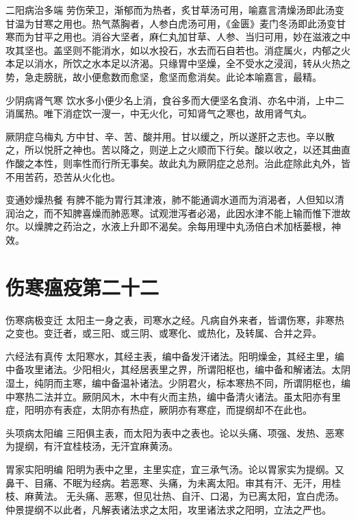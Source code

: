 \documentclass[a4paper,12pt,UTF8,twoside]{ctexbook}
\begin{document}
    二阳病治多端
    劳伤荣卫，渐郁而为热者，炙甘草汤可用，喻嘉言清燥汤即此汤变甘温为甘寒之用也。热气蒸胸者，人参白虎汤可用，《金匮》麦门冬汤即此汤变甘寒而为甘平之用也。消谷大坚者，麻仁丸加甘草、人参、当归可用，妙在滋液之中攻其坚也。盖坚则不能消水，如以水投石，水去而石自若也。消症属火，内郁之火本足以消水，所饮之水本足以济渴。只缘胃中坚燥，全不受水之浸润，转从火热之势，急走膀胱，故小便愈数而愈坚，愈坚而愈消矣。此论本喻嘉言，最精。
    
    少阴病肾气寒
    饮水多小便少名上消，食谷多而大便坚名食消、亦名中消，上中二消属热。唯下消症饮一溲一，中无火化，可知肾气之寒也，故用肾气丸。
    
    厥阴症乌梅丸
    方中甘、辛、苦、酸并用。甘以缓之，所以遂肝之志也。辛以散之，所以悦肝之神也。苦以降之，则逆上之火顺而下行矣。酸以收之，以还其曲直作酸之本性，则率性而行所无事矣。故此丸为厥阴症之总剂。治此症除此丸外，皆不用苦药，恐苦从火化也。
    
    变通妙燥热餐
    有脾不能为胃行其津液，肺不能通调水道而为消渴者，人但知以清润治之，而不知脾喜燥而肺恶寒。试观泄泻者必渴，此因水津不能上输而惟下泄故尔。以燥脾之药治之，水液上升即不渴矣。余每用理中丸汤倍白术加栝蒌根，神效。
    
    
    
    \chapter{伤寒瘟疫第二十二}
   	
    
    伤寒病极变迁
    太阳主一身之表，司寒水之经。凡病自外来者，皆谓伤寒，非寒热之变也。变迁者，或三阳、或三阴、或寒化、或热化，及转属、合并之异。
    
    六经法有真传
    太阳寒水，其经主表，编中备发汗诸法。阳明燥金，其经主里，编中备攻里诸法。少阳相火，其经居表里之界，所谓阳枢也，编中备和解诸法。太阴湿土，纯阴而主寒，编中备温补诸法。少阴君火，标本寒热不同，所谓阴枢也，编中寒热二法并立。厥阴风木，木中有火而主热，编中备清火诸法。虽太阳亦有里症，阳明亦有表症，太阴亦有热症，厥阴亦有寒症，而提纲却不在此也。
    
    头项病太阳编
    三阳俱主表，而太阳为表中之表也。论以头痛、项强、发热、恶寒为提纲，有汗宜桂枝汤，无汗宜麻黄汤。
    
    胃家实阳明编
    阳明为表中之里，主里实症，宜三承气汤。论以胃家实为提纲。又鼻干、目痛、不眠为经病。若恶寒、头痛，为未离太阳。审其有汗、无汗，用桂枝、麻黄法。
    无头痛、恶寒，但见壮热、自汗、口渴，为已离太阳，宜白虎汤。仲景提纲不以此者，凡解表诸法求之太阳，攻里诸法求之阳明，立法之严也。
    
\end{document}
